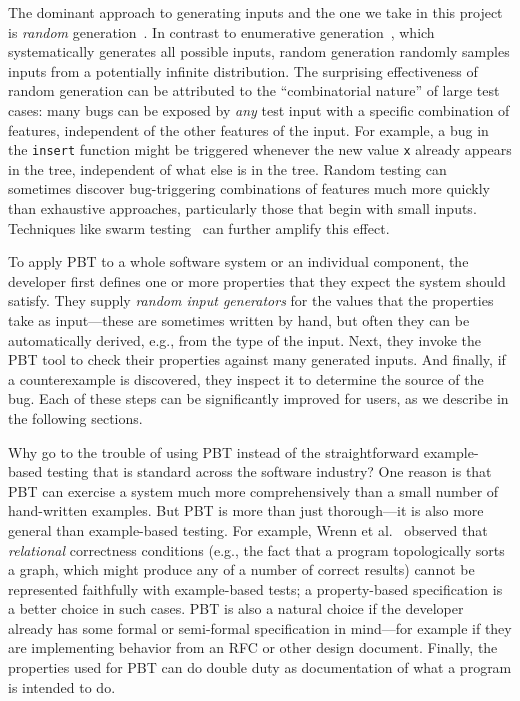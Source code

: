 The dominant approach to generating inputs and the one we take in this
project is {\em random}
generation~\cite{hamlet1994random}. In contrast to enumerative
generation~\cite{DBLP:conf/haskell/RuncimanNL08, leancheck}, which
systematically
generates all possible inputs, random generation randomly samples inputs from a
potentially infinite distribution. The
surprising effectiveness of random generation can be attributed to the
``combinatorial nature'' of large test cases: many bugs
can be exposed by {\em any} test input with a specific combination
of features, independent of the other features of the input. For
example, a bug in the {\tt insert} function might be triggered
whenever the new value {\tt x} already appears in the tree,
independent of what else is in the tree.
Random testing can sometimes
discover bug-triggering combinations of features much more quickly than
exhaustive approaches, particularly those that begin with small inputs. Techniques like swarm
testing~\cite{groce2012swarm} can further amplify this effect.

\smallskip

To apply PBT to a whole software system or an individual component, the
developer first defines one or more properties that they expect the
system should satisfy.  They supply {\em random input generators} for
the values that the properties take as input---these are sometimes
written by hand, but often they can be automatically derived, e.g.,
from the type of the input. Next, they invoke the PBT tool to check
their properties against many generated inputs. And finally, if a
counterexample is discovered, they inspect it to determine the source
of the bug.  Each of these steps can be significantly improved for
users, as we describe in the following sections.

Why go to the trouble of using PBT instead of the straightforward
example-based testing that is standard across the software industry?
One reason is that PBT can exercise a system much more
comprehensively than a small number of hand-written examples.
But
PBT is more than just thorough---it is also more general than example-based
testing. For example, Wrenn et al.~\cite{wrenn2021using} observed that
{\em relational} correctness conditions (e.g., the fact that a program
topologically sorts a graph, which might
produce any of a number of correct results) cannot be represented
faithfully with example-based tests; a property-based specification is
a better choice in such cases.
%
PBT is also
a natural choice if
the developer already has some formal or semi-formal
specification in mind---for example if they are implementing behavior from an RFC or
other design document.
Finally, the
properties used for PBT can do double duty as documentation of what a
program is intended to do.

